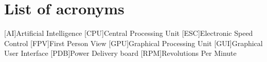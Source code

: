 \chapter*{List of acronyms}
\begin{acronym} 
    [AI]{Artificial Intelligence}
    [CPU]{Central Processing Unit}
    [ESC]{Electronic Speed Control}
    [FPV]{First Person View}
    [GPU]{Graphical Processing Unit}
    [GUI]{Graphical User Interface}
    [PDB]{Power Delivery board}
    [RPM]{Revolutions Per Minute}
\end{acronym}